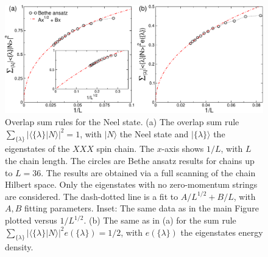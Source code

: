 \documentclass[11pt]{iopart}
\begin{document}
\begin{figure}[t]
\begin{center}
\includegraphics[width=.9\textwidth]{./draft_figs/Neel}
\end{center}
\caption{ Overlap sum rules for the Neel state. (a) The overlap sum rule 
 $\sum_{\{\lambda\}}|\langle\{\lambda\}|N\rangle|^2=1$, with $|N\rangle$ 
 the Neel state and $|\{\lambda\}\rangle$ the eigenstates  of the $XXX$ 
 spin chain. The $x$-axis shows $1/L$, with $L$ the chain length. The 
 circles are Bethe ansatz results for chains up to $L=36$. The results 
 are obtained via a full scanning of the chain Hilbert space. Only the 
 eigenstates with no zero-momentum strings are considered. The dash-dotted 
 line is a fit to $A/L^{1/2}+B/L$, with $A,B$ fitting parameters. Inset: 
 The same data as in the main Figure plotted versus $1/L^{1/2}$. (b) 
 The same as in (a) for the sum rule $\sum_{\{\lambda\}}|\langle\{
 \lambda\}|N\rangle|^2e(\{\lambda\})=1/2$, with $e(\{\lambda\})$  the 
 eigenstates energy density. 
}
\label{fig2-neel-sr}
\end{figure}
\end{document}
